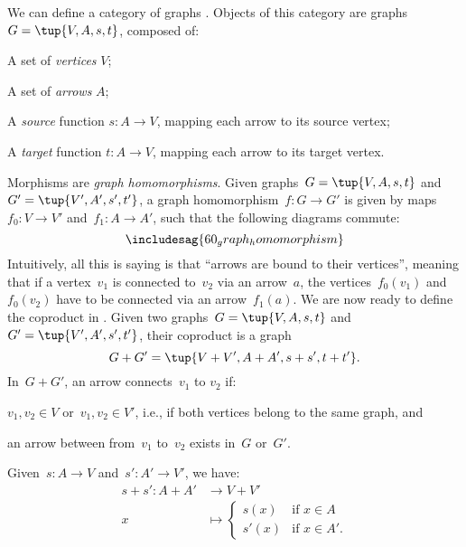 \begin{example}
  \label{def:Graph}
  We can define a category of graphs \iindex{\Graph}. Objects of this category are graphs~$G=\tup{V,A,s,t}$, composed of:
  \begin{compactitem}
    \item A set of \emph{vertices} $V$;
    \item A set of \emph{arrows} $A$;
    \item A \emph{source} function $s\colon A\to V$, mapping each arrow to its source vertex;
    \item A \emph{target} function $t\colon A\to V$, mapping each arrow to its target vertex.
  \end{compactitem}
  Morphisms are \emph{graph homomorphisms}. Given graphs~$G=\tup{V,A,s,t}$ and~$G'=\tup{V',A',s',t'}$, a graph homomorphism~$f\colon G\to G'$ is given by maps~$f_0\colon V\to V'$ and~$f_1\colon A\to A'$, such that the following diagrams commute:
  \begin{equation*}
    \includesag{60_graph_homomorphism}
  \end{equation*}
  Intuitively, all this is saying is that ``arrows are bound to their vertices'', meaning that if a vertex~$v_1$ is connected to~$v_2$ via an arrow~$a$, the vertices~$f_0(v_1)$ and~$f_0(v_2)$ have to be connected via an arrow~$f_1(a)$. We are now ready to define the coproduct in \Graph. Given two graphs~$G=\tup{V,A,s,t}$ and~$G'=\tup{V',A',s',t'}$, their coproduct is a graph
  \begin{equation*}
    G+G'=\tup{V+V',A+A',s+s',t+t'}.
  \end{equation*}
  In~$G+G'$, an arrow connects~$v_1$ to $v_2$ if:
  \begin{compactitem}
    \item $v_1,v_2\in V$ or~$v_1,v_2\in V'$, i.e., if both vertices belong to the same graph, and
    \item an arrow between from~$v_1$ to~$v_2$ exists in~$G$ or~$G'$.
  \end{compactitem}
  Given~$s\colon A\to V$ and~$s'\colon A'\to V'$, we have:
  \begin{equation*}
    \begin{aligned}
      s+ s'\colon A+ A'&\to V+ V'\\
      x&\mapsto
      \begin{cases}
        s(x)& \text{if } x\in A\\
        s'(x)&\text{if } x\in A'.
      \end{cases}

\end{aligned}
\end{equation*}
\end{example}
